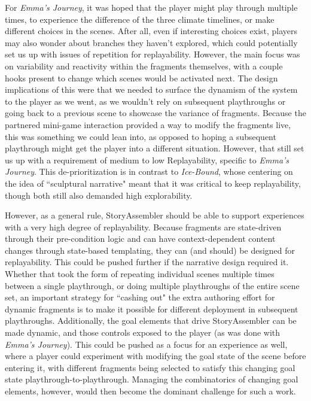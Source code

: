 For \textit{Emma's Journey}, it was hoped that the player might play through multiple times, to experience the difference of the three climate timelines, or make different choices in the scenes. After all, even if interesting choices exist, players may also wonder about branches they haven't explored, which could potentially set us up with issues of repetition for replayability. However, the main focus was on variability and reactivity within the fragments themselves, with a couple hooks present to change which scenes would be activated next. The design implications of this were that we needed to surface the dynamism of the system to the player as we went, as we wouldn't rely on subsequent playthroughs or going back to a previous scene to showcase the variance of fragments. Because the partnered mini-game interaction provided a way to modify the fragments live, this was something we could lean into, as opposed to hoping a subsequent playthrough might get the player into a different situation. However, that still set us up with a requirement of medium to low Replayability, specific to \textit{Emma's Journey}. This de-prioritization is in contrast to \textit{Ice-Bound}, whose centering on the idea of ``sculptural narrative" meant that it was critical to keep replayability, though both still also demanded high explorability.

However, as a general rule, StoryAssembler should be able to support experiences with a very high degree of replayability. Because fragments are state-driven through their pre-condition logic and can have context-dependent content changes through state-based templating, they can (and should) be designed for replayability. This could be pushed further if the narrative design required it. Whether that took the form of repeating individual scenes multiple times between a single playthrough, or doing multiple playthroughs of the entire scene set, an important strategy for ``cashing out" the extra authoring effort for dynamic fragments is to make it possible for different deployment in subsequent playthroughs. Additionally, the goal elements that drive StoryAssembler can be made dynamic, and those controls exposed to the player (as was done with \textit{Emma's Journey}). This could be pushed as a focus for an experience as well, where a player could experiment with modifying the goal state of the scene before entering it, with different fragments being selected to satisfy this changing goal state playthrough-to-playthrough. Managing the combinatorics of changing goal elements, however, would then become the dominant challenge for such a work.

